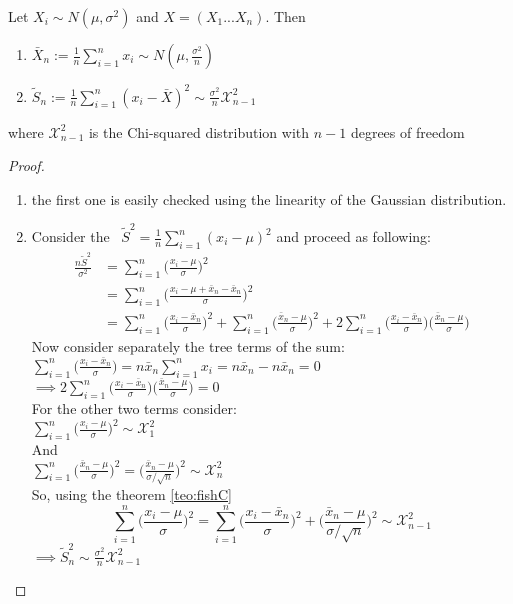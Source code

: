 \begin{prop}
	Let $ X_i\sim N(\mu, \sigma^2)$ and $X=(X_1...X_n)$. Then
	\begin{enumerate}
		\item $\bar X_n:=\frac{1}{n} \sum_{i=1}^n x_i \sim N(\mu, \frac{\sigma^2}{n})$
		\item $\tilde S_n:=\frac{1}{n} \sum_{i=1}^n (x_i - \bar X )^2 \sim \frac{\sigma^2}{n} \mathcal{X}_{n-1}^2$
	\end{enumerate}
	where $\mathcal{X}_{n-1}^2$ is the Chi-squared distribution with $n-1$ degrees of freedom
\end{prop}
\begin{proof}
	\begin{enumerate}
		\item the first one is easily checked using the linearity of the Gaussian distribution.
		\item Consider the \rv \  $\tilde S^2=\frac{1}{n}\sum_{i=1}^{n}(x_i- \mu)^2$ and proceed as following:
		\[
		\begin{split}
		\frac{n \tilde S^2}{\sigma^2}
		&=\sum_{i=1}^{n} \bigg( \frac{x_i- \mu}{\sigma} \bigg)^2\\
		&=\sum_{i=1}^{n} \bigg( \frac{x_i- \mu +\bar x_n -\bar x_n}{\sigma} \bigg)^2\\
		&=\sum_{i=1}^{n} \bigg( \frac{x_i- \bar x_n}{\sigma} \bigg)^2 + \sum_{i=1}^{n} \bigg( \frac{ \bar x_n - \mu}{\sigma} \bigg)^2 + 2 \sum_{i=1}^{n} \bigg( \frac{x_i- \bar x_n}{\sigma} \bigg) \bigg( \frac{ \bar x_n - \mu}{\sigma} \bigg)
		\end{split}
		\]
		Now consider separately the tree terms of the sum:\\
		$\sum_{i=1}^{n} \bigg( \frac{x_i- \bar x_n}{\sigma} \bigg) =n \bar x_n \sum_{i=1}^{n}x_i=n \bar x_n -n \bar x_n =0$\\
		$\implies 2 \sum_{i=1}^{n} \bigg( \frac{x_i- \bar x_n}{\sigma} \bigg) \bigg( \frac{ \bar x_n - \mu}{\sigma} \bigg)=0$ \\
		For the other two terms consider:\\
		$\sum_{i=1}^{n} \bigg( \frac{x_i- \mu}{\sigma} \bigg)^2 \sim \mathcal{X}_1^2$\\
		And\\
		$\sum_{i=1}^{n} \bigg( \frac{ \bar x_n - \mu}{\sigma} \bigg)^2= \bigg( \frac{ \bar x_n - \mu}{\sigma/ \sqrt{n}} \bigg)^2\sim \mathcal{X}_n^2$\\
		So, using the theorem \ref{teo:fishC}\\
		$$\sum_{i=1}^{n} \bigg( \frac{x_i- \mu}{\sigma} \bigg)^2= \sum_{i=1}^{n} \bigg( \frac{x_i- \bar x_n}{\sigma} \bigg)^2 +  \bigg( \frac{ \bar x_n - \mu}{\sigma/ \sqrt{n}} \bigg)^2 \sim \mathcal{X}_{n-1}^2$$
		$\implies \tilde S_n^2\sim \frac{\sigma^2}{n} \mathcal{X}_{n-1}^2 $
	\end{enumerate}
\end{proof}

